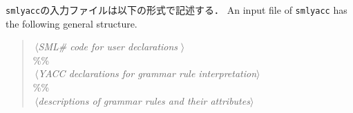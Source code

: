 \documentclass{jbook}
\newcommand{\txt}[2]{#2}
\newcommand{\smlsharp}{SML\#}
\newcommand{\code}[1]{\mbox{\large\tt #1}}
\newcommand{\nonterm}[1]{\mbox{$\,\langle$}{\it #1}\mbox{$\rangle\,$}}
\newenvironment{program}{\begin{quote}\begin{tt}}%
                        {\end{tt}\end{quote}}
\begin{document}
\ifjp%
	\code{smlyacc}の入力ファイルは以下の形式で記述する．
\else%
	An input file of \code{smlyacc} has the following general structure.
\fi%

\begin{program}
\nonterm{\txt{ユーザ定義の\smlsharp{}コード}{\smlsharp{} code for user declarations }}
\\
\%\%
\\
\nonterm{\txt{構文規則解析のためのYACC宣言}{YACC declarations for grammar rule interpretation}}
\\
\%\% 
\\
\nonterm{\txt{構文規則とその属性の定義}{descriptions of grammar rules and their attributes}}
\end{program}
\end{document}
